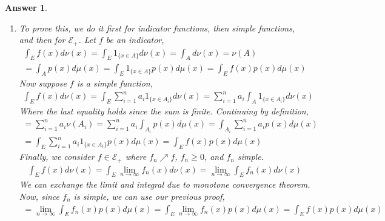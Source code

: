 \documentclass[12pt]{article}
\theoremstyle{colon}
\newtheorem*{answer}{Answer}
\begin{document}
\begin{answer}
\begin{enumerate}[label=\alph*)]
\begin{gather*}
        = \lim_{n \rightarrow \infty} \int_{\cup_{i \geq 1} A_i} p_n(x) d\mu(x) \text{ by monotone convergence theorem} \\
      \end{gather*}
      Which we proved for simple functions,
      \begin{gather*}
        = \lim_{n \rightarrow \infty} \sum_{i \geq 1} \int_{A_i} p_n(x) d\mu(x) \\
        = \sum_{i \geq 1} \int_{A_i} \lim_{n \rightarrow \infty}  p_n(x) d\mu(x) \text{ by monotone convergence theorem} \\
        = \sum_{i \geq 1} \int_{A_i} p(x) d\mu(x) = \sum_{i \geq 1} \nu(A_i)
      \end{gather*}
      So, $\nu(A)$ satisfies the three properties of a measure, so it is a measure.

    \item To prove this, we do it first for indicator functions, then simple functions, and then for $\mathcal{E}_+$. Let $f$ be an indicator,
      \begin{gather*}
        \int_E f(x) d\nu(x) = \int_E 1_{\{ x \in A \}} d\nu(x) = \int_A d\nu(x) = \nu(A) \\
        = \int_A p(x) d\mu(x) = \int_E 1_{\{ x \in A \}} p(x) d\mu(x) = \int_E f(x)p(x) d\mu(x)
      \end{gather*}
      Now suppose $f$ is a simple function,
      \begin{gather*}
        \int_E f(x) d\nu(x) = \int_E \sum_{i = 1}^n a_i 1_{\{ x \in A_i \}} d\nu(x) = \sum_{i = 1}^n a_i \int_A 1_{\{ x \in A_i \}} d\nu(x)
      \end{gather*}
      Where the last equality holds since the sum is finite. Continuing by definition,
      \begin{gather*}
        = \sum_{i = 1}^n a_i \nu(A_i) = \sum_{i = 1}^n a_i \int_{A_i} p(x) d\mu(x) = \int_{A_i} \sum_{i = 1}^n a_i p(x) d\mu(x) \\
        = \int_E \sum_{i = 1}^n a_i 1_{\{ x \in A_i \}} p(x) d\mu(x) = \int_E f(x) p(x) d\mu(x)
      \end{gather*}
      Finally, we consider $f \in \mathcal{E}_+$ where $f_n \nearrow f$, $f_n \geq 0$, and $f_n$ simple.
      \begin{gather*}
        \int_E f(x) d\nu(x) = \int_E \lim_{n \rightarrow \infty} f_n(x) d\nu(x) = \lim_{n \rightarrow \infty} \int_E f_n(x) d\nu(x)
      \end{gather*}
      We can exchange the limit and integral due to monotone convergence theorem. Now, since $f_n$ is simple, we can use our previous proof,
      \begin{gather*}
        = \lim_{n \rightarrow \infty} \int_E f_n(x) p(x) d\mu(x) = \int_E \lim_{n \rightarrow \infty} f_n(x) p(x) d\mu(x) = \int_E f(x) p(x) d\mu(x)
      \end{gather*}
  \end{enumerate}
\end{answer}
\end{document}
